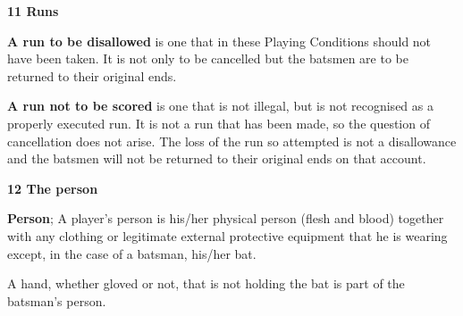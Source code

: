 \documentclass[12pt]{article}
\begin{document}
\vspace{\baselineskip}
{\fontsize{16pt}{19.2pt}\selectfont \textbf{11 Runs}\par}\par


\vspace{\baselineskip}
\begin{adjustwidth}{0.4in}{0.12in}
{\fontsize{9pt}{10.8pt} \tabto{0.39in} \textbf{A run to be disallowed }is one that in these Playing Conditions should not have been taken. It is not only to\textbf{ }be cancelled but the batsmen are to be returned to their original ends.\par}\par

\end{adjustwidth}


\vspace{\baselineskip}
\begin{adjustwidth}{0.4in}{0.12in}
{\fontsize{9pt}{10.8pt} \tabto{0.39in} \textbf{A run not to be scored }is one that is not illegal, but is not recognised as a properly executed run. It is not a\textbf{ }run that has been made, so the question of cancellation does not arise. The loss of the run so attempted is not a disallowance and the batsmen will not be returned to their original ends on that account.\par}\par

\end{adjustwidth}


\vspace{\baselineskip}
{\fontsize{16pt}{19.2pt}\selectfont \textbf{12 The person}\par}\par


\vspace{\baselineskip}
\begin{adjustwidth}{0.4in}{0.07in}
{\fontsize{9pt}{10.8pt} \tabto{0.39in} \textbf{Person}; A player’s person is his/her physical person (flesh and blood) together with any clothing or legitimate\textbf{ }external protective equipment that he is wearing except, in the case of a batsman, his/her bat.\par}\par

\end{adjustwidth}


\vspace{\baselineskip}
\begin{adjustwidth}{0.5in}{0.0in}
{\fontsize{9pt}{10.8pt}\selectfont A hand, whether gloved or not, that is not holding the bat is part of the batsman’s person.\par}\par

\end{adjustwidth}
\end{document}
